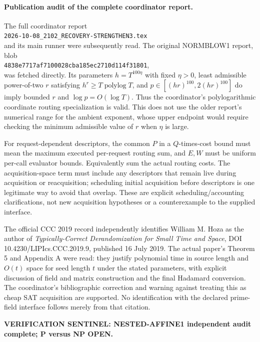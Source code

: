 \documentclass[11pt]{article}
\begin{document}
\paragraph{Publication audit of the complete coordinator report.}
The full coordinator report\\
\texttt{2026-10-08\_2102\_RECOVERY-STRENGTHEN3.tex}\\
and its main runner were subsequently read. The original NORMBLOW1 report,
blob\\ \texttt{4838e7717af7100028cba185ec2710d114f31801},\\ was fetched directly.
Its parameters $h=T^{100\eta}$ with fixed $\eta>0$, least admissible
power-of-two $r$ satisfying $h^r\ge T\operatorname{polylog}T$, and
$p\in[(hr)^{100},2(hr)^{100}]$ do imply bounded $r$ and
$\log p=O(\log T)$. Thus the coordinator's polylogarithmic coordinate
routing specialization is valid. This does not use the older report's
numerical range for the ambient exponent, whose upper endpoint would
require checking the minimum admissible value of $r$ when $\eta$ is large.

For request-dependent descriptors, the common $P$ in a $Q$-times-cost
bound must mean the maximum executed per-request routing sum, and $E,W$
must be uniform per-call evaluator bounds. Equivalently sum the actual
routing costs. The acquisition-space term must include any descriptors
that remain live during acquisition or reacquisition; scheduling initial
acquisition before descriptors is one legitimate way to avoid that
overlap. These are explicit scheduling/accounting clarifications, not
new acquisition hypotheses or a counterexample to the supplied interface.

The official CCC 2019 record independently identifies William M. Hoza
as the author of \emph{Typically-Correct Derandomization for Small Time
and Space}, DOI 10.4230/LIPIcs.CCC.2019.9, published 16 July 2019.
The actual paper's Theorem 5 and Appendix A were read: they justify
polynomial time in source length and $O(t)$ space for seed length $t$
under the stated parameters, with explicit discussion of field and
matrix construction and the final Hadamard conversion. The coordinator's
bibliographic correction and warning against treating this as cheap SAT
acquisition are supported. No identification with the declared
prime-field interface follows merely from that citation.

\bigskip\noindent\textbf{VERIFICATION SENTINEL: NESTED-AFFINE1 independent
audit complete; P versus NP OPEN.}
\end{document}
